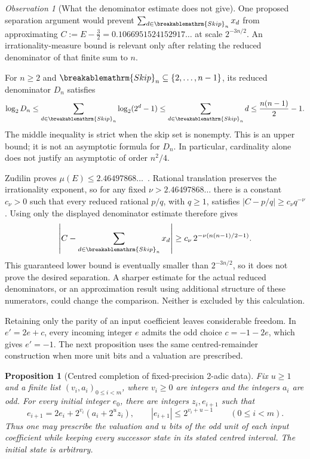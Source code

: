 \documentclass[11pt]{article}
\theoremstyle{plain}
\newtheorem{prop}[thm]{Proposition}
\theoremstyle{definition}
\theoremstyle{remark}
\newtheorem{obs}[thm]{Observation}
\renewcommand{\mathrm}[1]{\ifmmode\breakablemathrm{#1}\else\textrm{#1}\fi}%
\begin{document}
\begin{obs}[What the denominator estimate does not give]
\label{obs:irrationality-measure}
One proposed separation argument would prevent
$\sum_{d\in\mathrm{Skip}_n}x_d$ from approximating
$C:=E-\tfrac32=0.1066951524152917\ldots$ at scale $2^{-3n/2}$.
An irrationality-measure bound is relevant only after relating the
reduced denominator of that finite sum to $n$.

For $n\ge2$ and $\mathrm{Skip}_n\subseteq\{2,\ldots,n-1\}$, its
reduced denominator $D_n$ satisfies
\[
 \log_2 D_n\le\sum_{d\in\mathrm{Skip}_n}\log_2(2^d-1)
 \le\sum_{d\in\mathrm{Skip}_n}d
 \le\frac{n(n-1)}2-1.
\]
The middle inequality is strict when the skip set is nonempty.
This is an upper bound; it is not an asymptotic formula for $D_n$.
In particular, cardinality alone does not justify an asymptotic of
order $n^2/4$.

Zudilin proves $\mu(E)\le2.46497868\ldots$~\cite[Theorem~1, p.~154]{zudilin2004}.
Rational translation preserves the irrationality exponent, so for
any fixed $\nu>2.46497868\ldots$ there is a constant $c_\nu>0$
such that every reduced rational $p/q$, with $q\ge1$, satisfies
$|C-p/q|\ge c_\nu q^{-\nu}$.
Using only the displayed denominator estimate therefore gives
\[
 \left|C-\sum_{d\in\mathrm{Skip}_n}x_d\right|
 \ge c_\nu\,2^{-\nu(n(n-1)/2-1)}.
\]
This guaranteed lower bound is eventually smaller than $2^{-3n/2}$,
so it does not prove the desired separation.  A sharper estimate
for the actual reduced denominators, or an approximation result
using additional structure of these numerators, could change the
comparison.  Neither is excluded by this calculation.
\end{obs}

Retaining only the parity of an input coefficient leaves considerable
freedom.  In $e'=2e+c$, every incoming integer $e$ admits the odd
choice $c=-1-2e$, which gives $e'=-1$.  The next proposition uses
the same centred-remainder construction when more unit bits and
a valuation are prescribed.

\begin{prop}[Centred completion of fixed-precision 2-adic data]
\label{prop:2adic-nogo}
Fix $u\ge1$ and a finite list $(v_i,a_i)_{0\le i<m}$, where
$v_i\ge0$ are integers and the integers $a_i$ are odd.  For every
initial integer $e_0$, there are integers $z_i,e_{i+1}$ such that
\[
 e_{i+1}=2e_i+2^{v_i}(a_i+2^u z_i),\qquad
 |e_{i+1}|\le2^{v_i+u-1}\qquad(0\le i<m).
\]
Thus one may prescribe the valuation and $u$ bits of the odd unit
of each input coefficient while keeping every \emph{successor}
state in its stated centred interval.  The initial state is arbitrary.
\end{prop}
\end{document}

